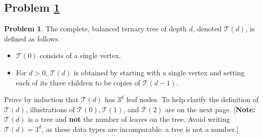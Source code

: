 \documentclass[11pt]{article}
\theoremstyle{definition}
\theoremstyle{definition}
\newtheorem{required}{Problem}
\theoremstyle{definition}
\begin{document}
\subsection{Problem \ref{Induction3}}
\begin{required} \label{Induction3}
The complete, balanced ternary tree of depth $d$, denoted $\mathcal{T}(d)$, is defined as follows. 
\begin{itemize}
\item $\mathcal{T}(0)$ consists of a single vertex.
\item For $d > 0$, $\mathcal{T}(d)$ is obtained by starting with a single vertex and setting each of its three children to be copies of $\mathcal{T}(d-1)$.
\end{itemize}

\noindent Prove by induction that $\mathcal{T}(d)$ has $3^{d}$ leaf nodes. To help clarify the definition of $\mathcal{T}(d)$, illustrations of $\mathcal{T}(0), \mathcal{T}(1)$, and $\mathcal{T}(2)$ are on the next page. [\textbf{Note:} $\mathcal{T}(d)$ is a tree and \textbf{not} the number of leaves on the tree. Avoid writing $\mathcal{T}(d) = 3^{d}$, as these data types are incomparable: a tree is not a number.]
\end{required}
\end{document}
